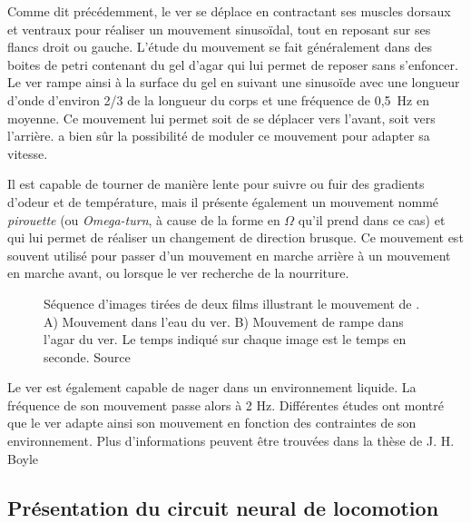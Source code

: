 Comme dit précédemment, le ver se déplace en contractant ses muscles dorsaux et
ventraux pour réaliser un mouvement sinusoïdal, tout en reposant sur ses
flancs droit ou gauche. L'étude du mouvement se fait généralement dans des
boites de petri contenant du gel d'agar qui lui permet de reposer
sans s'enfoncer. Le ver rampe ainsi à la surface du gel en suivant une
sinusoïde avec une longueur d'onde d'environ 2/3 de la longueur du corps et 
une fréquence de 0,5~Hz en moyenne\cite{Boyle2009}. Ce mouvement lui permet
soit de se déplacer vers l'avant, soit vers l'arrière. \celeg{} a bien sûr
la possibilité de moduler ce mouvement pour adapter sa vitesse.

Il est capable de tourner de manière lente pour suivre ou fuir des gradients
d'odeur et de température, mais il présente également un mouvement nommé
\textit{pirouette} (ou \textit{Omega-turn}, à cause de la forme en $\Omega$ qu'il
prend dans ce cas) et qui lui permet de réaliser un changement de direction
brusque. Ce mouvement est souvent utilisé pour passer d'un mouvement en marche
arrière à un mouvement en marche avant, ou lorsque le ver recherche de la
nourriture.\\

\begin{figure}[ht]
   \begin{center}
   \end{center}
   \caption[Séquence d'image du mouvement de \celeg{}]{Séquence d'images tirées de deux films illustrant le mouvement de
   \celeg{}. A) Mouvement dans l'eau du ver. B) Mouvement de rampe dans l'agar du ver. Le
   temps indiqué sur chaque image est le temps en seconde. Source
   \cite{Boyle2009}}
   \label{fig:celegans_mouvement}
\end{figure}

Le ver est également capable de nager dans un environnement liquide. La fréquence
de son mouvement passe alors à 2 Hz. Différentes études ont montré que le ver
adapte ainsi son mouvement en fonction des contraintes de son environnement.
Plus d'informations peuvent être trouvées dans la thèse de J. H. Boyle \cite{Boyle2009}


\subsection{Présentation du circuit neural de locomotion} %
\label{sub:Présentation du circuit neural de locomotion}

